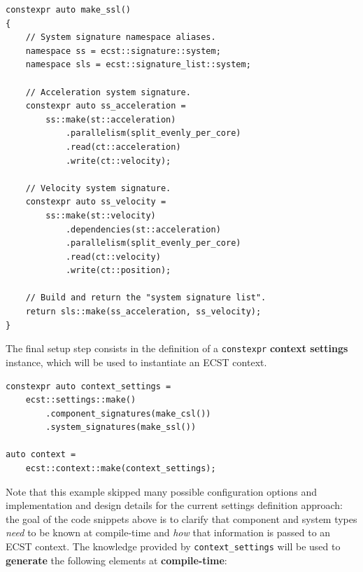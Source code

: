 \documentclass[twoside, 12pt, a4paper, openany]{book}
\begin{document}
\begin{verbatim}
constexpr auto make_ssl()
{
    // System signature namespace aliases.
    namespace ss = ecst::signature::system;
    namespace sls = ecst::signature_list::system;

    // Acceleration system signature.
    constexpr auto ss_acceleration =
        ss::make(st::acceleration)
            .parallelism(split_evenly_per_core)
            .read(ct::acceleration)
            .write(ct::velocity);

    // Velocity system signature.
    constexpr auto ss_velocity =
        ss::make(st::velocity)
            .dependencies(st::acceleration)
            .parallelism(split_evenly_per_core)
            .read(ct::velocity)
            .write(ct::position);

    // Build and return the "system signature list".
    return sls::make(ss_acceleration, ss_velocity);
}
\end{verbatim}

The final setup step consists in the definition of a
\texttt{constexpr}
\textbf{context settings} instance, which will be used to instantiate an
ECST context.

\begin{verbatim}
constexpr auto context_settings =
    ecst::settings::make()
        .component_signatures(make_csl())
        .system_signatures(make_ssl())

auto context =
    ecst::context::make(context_settings);
\end{verbatim}

Note that this example skipped many possible configuration options and
implementation and design details for the current settings definition
approach: the goal of the code snippets above is to clarify that
component and system types \emph{need} to be known at compile-time and
\emph{how} that information is passed to an ECST context. The knowledge
provided by
\texttt{context_settings}
will be used to \textbf{generate} the following elements at
\textbf{compile-time}:
\end{document}
